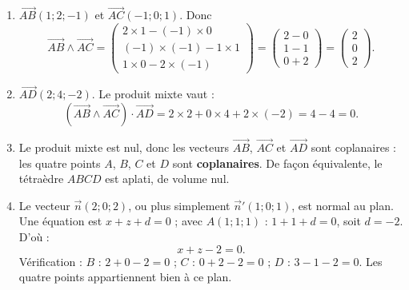 \documentclass[11pt]{article}
\begin{document}
\begin{corrige}
\begin{enumerate}
\item $\overrightarrow{AB}(1 ; 2 ; -1)$ et $\overrightarrow{AC}(-1 ; 0 ; 1)$. Donc
\[ \overrightarrow{AB} \wedge \overrightarrow{AC} = \begin{pmatrix} 2\times 1 - (-1)\times 0 \\ (-1)\times(-1) - 1\times 1 \\ 1\times 0 - 2\times(-1) \end{pmatrix} = \begin{pmatrix} 2-0 \\ 1-1 \\ 0+2 \end{pmatrix} = \begin{pmatrix} 2 \\ 0 \\ 2 \end{pmatrix}. \]
\item $\overrightarrow{AD}(2 ; 4 ; -2)$. Le produit mixte vaut :
\[ \left(\overrightarrow{AB} \wedge \overrightarrow{AC}\right) \cdot \overrightarrow{AD} = 2\times 2 + 0\times 4 + 2\times(-2) = 4 - 4 = 0. \]
\item Le produit mixte est nul, donc les vecteurs $\overrightarrow{AB}$, $\overrightarrow{AC}$ et $\overrightarrow{AD}$ sont coplanaires : les quatre points $A$, $B$, $C$ et $D$ sont \textbf{coplanaires}. De façon équivalente, le tétraèdre $ABCD$ est aplati, de volume nul.
\item Le vecteur $\vec{n}(2 ; 0 ; 2)$, ou plus simplement $\vec{n}'(1 ; 0 ; 1)$, est normal au plan. Une équation est $x + z + d = 0$ ; avec $A(1 ; 1 ; 1)$ : $1 + 1 + d = 0$, soit $d = -2$. D'où :
\[ x + z - 2 = 0. \]
Vérification : $B$ : $2 + 0 - 2 = 0$ ; $C$ : $0 + 2 - 2 = 0$ ; $D$ : $3 - 1 - 2 = 0$. Les quatre points appartiennent bien à ce plan.
\end{enumerate}
\end{corrige}
\end{document}
